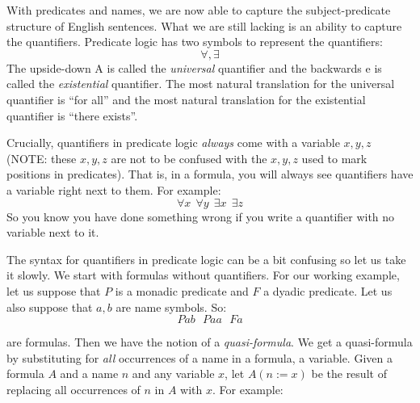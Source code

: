 \documentclass[
]{book}
\begin{document}
With predicates and names, we are now able to capture the subject-predicate structure of English sentences. What we are still lacking is an ability to capture the quantifiers. Predicate logic has two symbols to represent the quantifiers:
\[
\forall, \exists
\]
The upside-down A is called the \emph{universal} quantifier and the backwards e is called the \emph{existential} quantifier. The most natural translation for the universal quantifier is ``for all'' and the most natural translation for the existential quantifier is ``there exists''.

Crucially, quantifiers in predicate logic \emph{always} come with a variable \(x,y,z\) (NOTE: these \(x,y,z\) are not to be confused with the \(x,y,z\) used to mark positions in predicates). That is, in a formula, you will always see quantifiers have a variable right next to them. For example:
\[
\forall x \:\: \forall y \:\: \exists x \:\: \exists z 
\]
So you know you have done something wrong if you write a quantifier with no variable next to it.

The syntax for quantifiers in predicate logic can be a bit confusing so let us take it slowly. We start with formulas without quantifiers. For our working example, let us suppose that \(P\) is a monadic predicate and \(F\) a dyadic predicate. Let us also suppose that \(a,b\) are name symbols. So:
\[
Pab \:\:\: Paa \:\:\: Fa
\]

are formulas. Then we have the notion of a \emph{quasi-formula}. We get a quasi-formula by substituting for \emph{all} occurrences of a name in a formula, a variable. Given a formula \(A\) and a name \(n\) and any variable \(x\), let \(A(n:=x)\) be the result of replacing all occurrences of \(n\) in \(A\) with \(x\). For example:
\end{document}
